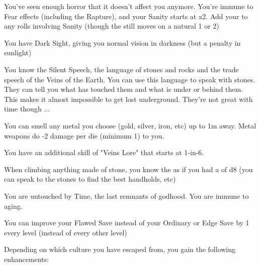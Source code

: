 {  

  You've seen enough horror that it doesn't affect you anymore.  You're immune to Fear effects (including the Rapture), and your Sanity starts at \DCUP x2.  Add your \LVL to any rolls involving Sanity (though the \UD still moves \DCDOWN on a natural 1 or 2)

  You have Dark Sight, giving you normal vision in darkness (but a penalty in sunlight)

  You know the Silent Speech, the language of stones and rocks and the trade speech of the Veins of the Earth.  You can use this language to speak with stones. They can tell you what has touched them and what is under or behind them.  This makes it almost impossible to get lost underground. They're not great with time though ...

  You can smell any metal you choose (gold, silver, iron, etc) up to 1m away.  Metal weapons do -2 damage per die (minimum 1) to you.  

  You have an additional skill of "Veins Lore" that starts at 1-in-6. 



  When climbing anything made of stone, you know the  as if you had a \KNAVE of d8 (you can speak to the stones to find the best handholds, etc)

  You are untouched by Time, the last remnants of godhood.  You are immune to aging.

  You can improve your Flawed Save instead of your Ordinary or Edge Save by 1 every level (instead of every other level)

  Depending on which culture you have escaped from, you gain the following enhancements:

}
